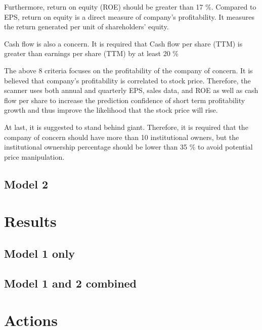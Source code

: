 \documentclass{article}
\begin{document}
Furthermore, return on equity (ROE) should be greater than 17 \%. Compared to EPS, return on equity is a direct measure of company's profitability. It measures the return generated per unit of shareholders' equity.

Cash flow is also a concern. It is required that Cash flow per share (TTM) is greater than earnings per share (TTM) by at least 20 \%

The above 8 criteria focuses on the profitability of the company of concern. It is believed that company's profitability is correlated to stock price. Therefore, the scanner uses both annual and quarterly EPS, sales data, and ROE as well as cash flow per share to increase the prediction confidence of short term profitability growth and thus improve the likelihood that the stock price will rise.

At last, it is suggested to stand behind giant. Therefore, it is required that the company of concern should have more than 10 institutional owners, but the institutional ownership percentage should be lower than 35 \% to avoid potential price manipulation.

\subsection{Model 2}

\section{Results}
\subsection{Model 1 only}

\subsection{Model 1 and 2 combined}

\section{Actions}
\end{document}
